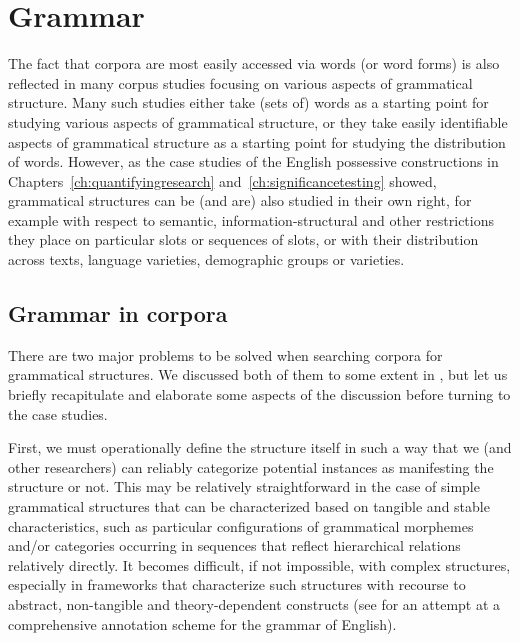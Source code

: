 \chapter{Grammar}
\label{ch:grammar}

The fact that corpora are most easily accessed via words (or word forms) is also reflected in many corpus studies focusing on various aspects of grammatical  structure. Many such studies either take (sets of) words as a starting point for studying various aspects of grammatical structure, or they take easily identifiable aspects of grammatical structure as a starting point for studying the distribution  of words. However, as the case studies of the English possessive  constructions in Chapters~\ref{ch:quantifyingresearch} and~\ref{ch:significancetesting} showed, grammatical structures can be (and are) also studied in their own right, for example with respect to semantic,  information\hyp{}structural and other restrictions they place on particular slots or sequences of slots, or with their distribution  across texts, language varieties,  demographic  groups or varieties.

\section{Grammar in corpora}
\label{sec:grammarincorpora}

There are two major problems to be solved when searching corpora for grammatical  structures. We discussed both of them to some extent in , but let us briefly recapitulate and elaborate some aspects of the discussion before turning to the case studies.

First, we must operationally  define the structure itself in such a way that we (and other researchers) can reliably  categorize  potential instances as manifesting the structure or not. This may be relatively straightforward in the case of simple grammatical  structures that can be characterized based on tangible and stable characteristics, such as particular configurations of grammatical morphemes  and\slash or categories  occurring in sequences that reflect hierarchical relations relatively directly. It becomes difficult, if not impossible, with complex  structures, especially in frameworks that characterize such structures with recourse to abstract, non\hyp{}tangible and theory\hyp{}dependent constructs (see \citealt{sampson_english_1995} for an attempt at a comprehensive annotation scheme for the grammar of English).

